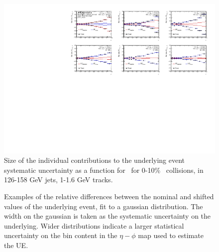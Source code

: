 \begin{figure}
\centerline{\includegraphics[page=1,width=1.\textwidth]{figures/main/systematics/Summary_UE_RDpT_dR_sys_error}}
    \caption{Size of the individual contributions to the underlying event systematic uncertainty as a function for \rvar\ for 0-10\% \pbpb\ collisions, in 126-158 GeV jets, 1-1.6 GeV tracks.}
    \label{fig:UE_sys_contrib}
\end{figure}

\begin{figure}
   \caption{Examples of the relative differences between the nominal and shifted values of the underlying event, fit to a gaussian distribution.
The width on the gaussian is taken as the systematic uncertainty on the underlying.
Wider distributions indicate a larger statistical uncertainty on the bin content in the $\eta-\phi$ map used to estimate the UE.}
      \label{fig:gaus_diff}
\end{figure}


